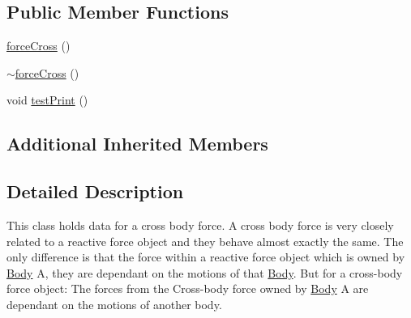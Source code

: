 \subsection*{Public Member Functions}
\begin{DoxyCompactItemize}
\item 
\hyperlink{classforce_cross_af0be04e57068498fb3981f08c40fd2d8}{force\-Cross} ()
\item 
\hyperlink{classforce_cross_a7f0f7dc9e6a4df6fac64001fee1ec4fc}{$\sim$force\-Cross} ()
\item 
void \hyperlink{classforce_cross_a7de475ba730e89d0aa37eb4cfd64a82a}{test\-Print} ()
\end{DoxyCompactItemize}
\subsection*{Additional Inherited Members}


\subsection{Detailed Description}
This class holds data for a cross body force. A cross body force is very closely related to a reactive force object and they behave almost exactly the same. The only difference is that the force within a reactive force object which is owned by \hyperlink{class_body}{Body} A, they are dependant on the motions of that \hyperlink{class_body}{Body}. But for a cross-\/body force object\-: The forces from the Cross-\/body force owned by \hyperlink{class_body}{Body} A are dependant on the motions of another body. 

